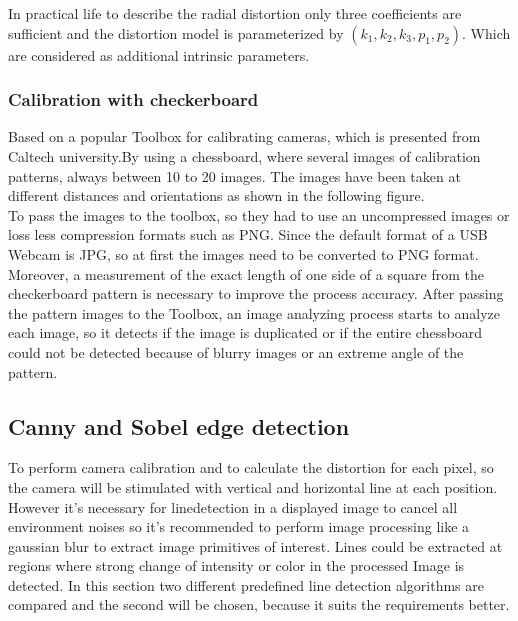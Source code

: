 \documentclass[journal,final,a4paper,twoside]{PS}
\begin{document}
In practical life to describe the radial distortion only three coefficients are sufficient and the distortion model is parameterized by $(k_1,k_2,k_3,p_1,p_2)$. Which are considered as additional intrinsic parameters.

\subsubsection{Calibration with checkerboard}
Based on a popular Toolbox for calibrating cameras, which is presented from Caltech university.By using a chessboard, where several images of calibration patterns, always between 10 to 20 images. The images have been taken at different distances and orientations as shown in the following figure.
\\
To pass the images to the toolbox, so they had to use an uncompressed images or loss less compression formats such as PNG. Since the default format of a USB Webcam is JPG, so at first the images need to be converted to PNG format. Moreover, a measurement of the exact length of one side of a square from the checkerboard pattern is necessary to improve the process accuracy. After passing the pattern images to the Toolbox, an image analyzing process starts to analyze each image, so it detects if the image is duplicated or if the entire chessboard could not be detected because of blurry images or an extreme angle of the pattern.

\subsection{Canny and Sobel edge detection}
\label{sec:Canny}
To perform camera calibration and to calculate the distortion for each pixel, so the camera will be stimulated with vertical and horizontal line at each position. However it's necessary for linedetection in a displayed image to cancel all environment noises so it's recommended to perform image processing like a gaussian blur to extract image primitives of interest. 
Lines could be extracted at regions where strong change of intensity or color in the processed Image is detected. In this section two different predefined line detection algorithms are compared and the second will be chosen, because it suits the requirements better.
\end{document}
